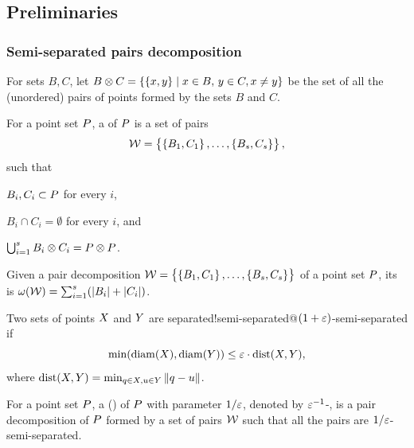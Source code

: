\documentclass[12pt]{article}%
\begin{document}
\subsection{Preliminaries}

\subsubsection{Semi-separated pairs decomposition}

For sets $B, C$, let
$B \otimes C= \left\{ \left\{ {x,y} \right\} \;\middle\vert\;  x\in B,\, y\in C, x \ne y  \right\}$ be the set
of all the (unordered) pairs of points formed by the sets $B$ and $C$.

\begin{defn}
    For a point set $P$, a  of $P$ is a set of pairs
    \begin{equation*}        
        \mathcal{W} = \left\{ {\bigl. \left\{ {B_1,C_1} \right\},\ldots,\left\{ {B_s,C_s} \right\}} \right\},
    \end{equation*}
    such that
    \begin{enumerate*}[label=(\Roman*)]
        \item $B_i,C_i\subset P$ for every $i$,
        \item $B_i \cap C_i = \emptyset$ for every $i$, and
        \item $\bigcup_{i=1}^s B_i \otimes C_i = P \otimes P$.
    \end{enumerate*}
\end{defn}

\begin{defn}
    Given a pair decomposition
    $\mathcal{W} = \left\{ {\bigl. \left\{ {B_1,C_1} \right\},\ldots,\left\{ {B_s, C_s} \right\}} \right\}$ of a
    point set $P$, its  is
    $\WeightX{\WSPDRep} = \sum_{i=1}^s \pth{ \cardin{B_i } +
       \cardin{C_i}}$.
\end{defn}


\begin{defn}%
    Two sets of points $X$ and $Y$ are
    {separated!semi-separated@$(1+\varepsilon)$-semi-separated} if
    \begin{equation*}
        \min \pth{ \diameterX{\PSB}, \diameterX{\PSC} } \leq \eps \cdot
        \DistSetY{\PSB}{\PSC},%
    \end{equation*}
    where
    $\DistSetY{ \PSB}{\PSC} = \min_{\pb \in \PSB, \pc \in \PSC}
    \dY{\pb}{\pc}$.

    For a point set $P$, a  (\emphOnly{\SSPD{}}) of $P$ with parameter
    $1/\varepsilon$, denoted by $\varepsilon^{-1}$-\SSPD, is a pair decomposition of
    $P$ formed by a set of pairs $\mathcal{W}$ such that all the pairs
    are $1/\varepsilon$-semi-separated.
\end{defn}
\end{document}
